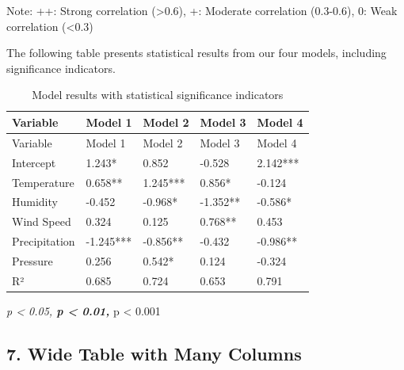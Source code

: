 \documentclass[
  letterpaper,
  oneside,
  openany]{MastersDoctoralThesis}
\begin{document}
Note: ++: Strong correlation (\textgreater0.6), +: Moderate correlation
(0.3-0.6), 0: Weak correlation (\textless0.3)

The following table presents statistical results from our four models,
including significance indicators.

\begin{longtable}[]{@{}lllll@{}}
\caption{Model results with statistical significance
indicators}\label{tbl-app-b-significance}\tabularnewline
\toprule\noalign{}
Variable & Model 1 & Model 2 & Model 3 & Model 4 \\
\midrule\noalign{}
\endfirsthead
\toprule\noalign{}
Variable & Model 1 & Model 2 & Model 3 & Model 4 \\
\midrule\noalign{}
\endhead
\bottomrule\noalign{}
\endlastfoot
Intercept & 1.243* & 0.852 & -0.528 & 2.142*** \\
Temperature & 0.658** & 1.245*** & 0.856* & -0.124 \\
Humidity & -0.452 & -0.968* & -1.352** & -0.586* \\
Wind Speed & 0.324 & 0.125 & 0.768** & 0.453 \\
Precipitation & -1.245*** & -0.856** & -0.432 & -0.986** \\
Pressure & 0.256 & 0.542* & 0.124 & -0.324 \\
R² & 0.685 & 0.724 & 0.653 & 0.791 \\
\end{longtable}

\emph{p \textless{} 0.05, \textbf{p \textless{} 0.01, }}p \textless{}
0.001

\subsection{7. Wide Table with Many Columns}\label{sec-app-b-wide-table}
\end{document}
